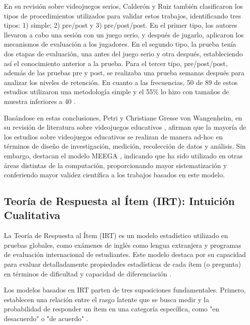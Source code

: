 En su revisión sobre videojuegos serios, Calderón y Ruiz \cite{CalderonRuizReviewSeriousGamesEvaluation} también clasificaron los tipos de procedimientos utilizados para validar estos trabajos, identificando tres tipos: 1) simple; 2) pre/post y 3) pre/post/post. En el primer tipo, los autores llevaron a cabo una sesión con un juego serio, y después de jugarlo, aplicaron los mecanismos de evaluación a los jugadores. En el segundo tipo, la prueba tenía dos etapas de evaluación, una antes del juego serio y otra después, estableciendo así el conocimiento anterior a la prueba. Para el tercer tipo, pre/post/post, además de las pruebas pre y post, se realizaba una prueba semanas después para analizar los niveles de retención. En cuanto a las frecuencias, 50 de 89 de estos estudios utilizaron una metodología simple y el 55\% lo hizo con tamaños de muestra inferiores a 40 \cite{CalderonRuizReviewSeriousGamesEvaluation}.

Basándose en estas conclusiones, Petri y Christiane Gresse von Wangenheim, en su revisión de literatura sobre videojuegos educativos \cite{HowGamesComputingEducationEvaluated}, afirman que la mayoría de los estudios sobre videojuegos educativos se realizan de manera ad-hoc en términos de diseño de investigación, medición, recolección de datos y análisis. Sin embargo, destacan el modelo MEEGA \cite{meegaplusQualityEvaluationPage}, indicando que ha sido utilizado en otras áreas distintas de la computación, proporcionando mayor sistematización y conferiendo mayor validez científica a los trabajos basados en este modelo.


\subsection{Teoría de Respuesta al Ítem (IRT): Intuición Cualitativa}

La Teoría de Respuesta al Ítem (IRT) es un modelo estadístico utilizado en pruebas globales, como exámenes de inglés como lengua extranjera y programas de evaluación internacional de estudiantes. Este modelo destaca por su capacidad para evaluar detalladamente propiedades estadísticas de cada ítem (o pregunta) en términos de dificultad y capacidad de diferenciación \cite{Linden2015HandbookOI, IRTShojima2022}.

Los modelos basados en IRT parten de tres suposiciones fundamentales. Primero, establecen una relación entre el rasgo latente que se busca medir y la probabilidad de responder un ítem en una categoría específica, como "en desacuerdo" o "de acuerdo" \cite{CalderonStatisticalIRT}.

